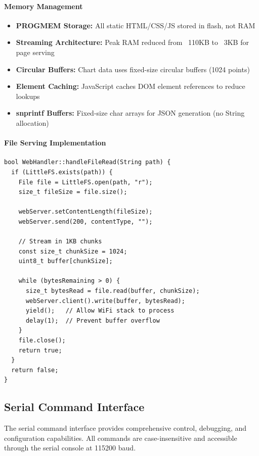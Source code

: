 \paragraph{Memory Management}
\begin{itemize}
    \item \textbf{PROGMEM Storage:} All static HTML/CSS/JS stored in flash, not RAM
    \item \textbf{Streaming Architecture:} Peak RAM reduced from ~110KB to ~3KB for page serving
    \item \textbf{Circular Buffers:} Chart data uses fixed-size circular buffers (1024 points)
    \item \textbf{Element Caching:} JavaScript caches DOM element references to reduce lookups
    \item \textbf{snprintf Buffers:} Fixed-size char arrays for JSON generation (no String allocation)
\end{itemize}

\paragraph{File Serving Implementation}
\begin{lstlisting}[caption=Chunked File Serving for Large Assets]
bool WebHandler::handleFileRead(String path) {
  if (LittleFS.exists(path)) {
    File file = LittleFS.open(path, "r");
    size_t fileSize = file.size();
    
    webServer.setContentLength(fileSize);
    webServer.send(200, contentType, "");
    
    // Stream in 1KB chunks
    const size_t chunkSize = 1024;
    uint8_t buffer[chunkSize];
    
    while (bytesRemaining > 0) {
      size_t bytesRead = file.read(buffer, chunkSize);
      webServer.client().write(buffer, bytesRead);
      yield();   // Allow WiFi stack to process
      delay(1);  // Prevent buffer overflow
    }
    file.close();
    return true;
  }
  return false;
}
\end{lstlisting}

\subsection{Serial Command Interface}
\label{sec:serial-commands}

The serial command interface provides comprehensive control, debugging, and configuration capabilities. All commands are case-insensitive and accessible through the serial console at 115200 baud.

